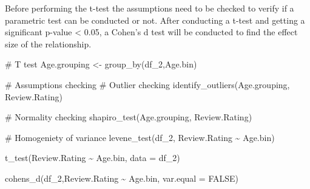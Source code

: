 \documentclass[
  letterpaper,
  DIV=11,
  numbers=noendperiod]{scrartcl}
\newenvironment{Shaded}{\begin{snugshade}}{\end{snugshade}}
\newcommand{\AttributeTok}[1]{\textcolor[rgb]{0.40,0.45,0.13}{#1}}
\newcommand{\CommentTok}[1]{\textcolor[rgb]{0.37,0.37,0.37}{#1}}
\newcommand{\ConstantTok}[1]{\textcolor[rgb]{0.56,0.35,0.01}{#1}}
\newcommand{\FunctionTok}[1]{\textcolor[rgb]{0.28,0.35,0.67}{#1}}
\newcommand{\NormalTok}[1]{\textcolor[rgb]{0.00,0.23,0.31}{#1}}
\newcommand{\OtherTok}[1]{\textcolor[rgb]{0.00,0.23,0.31}{#1}}
\newcommand{\SpecialCharTok}[1]{\textcolor[rgb]{0.37,0.37,0.37}{#1}}
\begin{document}
Before performing the t-test the assumptions need to be checked to
verify if a parametric test can be conducted or not. After conducting a
t-test and getting a significant p-value \textless{} 0.05, a Cohen's d
test will be conducted to find the effect size of the relationship.

\begin{Shaded}
\begin{Highlighting}[]
\CommentTok{\# T test}
\NormalTok{Age.grouping }\OtherTok{\textless{}{-}} \FunctionTok{group\_by}\NormalTok{(df\_2,Age.bin)}
\end{Highlighting}
\end{Shaded}

\begin{Shaded}
\begin{Highlighting}[]
\CommentTok{\# Assumptions checking}
\CommentTok{\# Outlier checking}
\FunctionTok{identify\_outliers}\NormalTok{(Age.grouping, Review.Rating)}
\end{Highlighting}
\end{Shaded}

\begin{Shaded}
\begin{Highlighting}[]
\CommentTok{\# Normality checking}
\FunctionTok{shapiro\_test}\NormalTok{(Age.grouping, Review.Rating)}
\end{Highlighting}
\end{Shaded}

\begin{Shaded}
\begin{Highlighting}[]
\CommentTok{\# Homogeniety of variance}
\FunctionTok{levene\_test}\NormalTok{(df\_2, Review.Rating }\SpecialCharTok{\textasciitilde{}}\NormalTok{ Age.bin)}
\end{Highlighting}
\end{Shaded}

\begin{Shaded}
\begin{Highlighting}[]
\FunctionTok{t\_test}\NormalTok{(Review.Rating }\SpecialCharTok{\textasciitilde{}}\NormalTok{ Age.bin, }\AttributeTok{data =}\NormalTok{ df\_2)}
\end{Highlighting}
\end{Shaded}

\begin{Shaded}
\begin{Highlighting}[]
\FunctionTok{cohens\_d}\NormalTok{(df\_2,Review.Rating }\SpecialCharTok{\textasciitilde{}}\NormalTok{ Age.bin, }\AttributeTok{var.equal =} \ConstantTok{FALSE}\NormalTok{)}
\end{Highlighting}
\end{Shaded}
\end{document}
